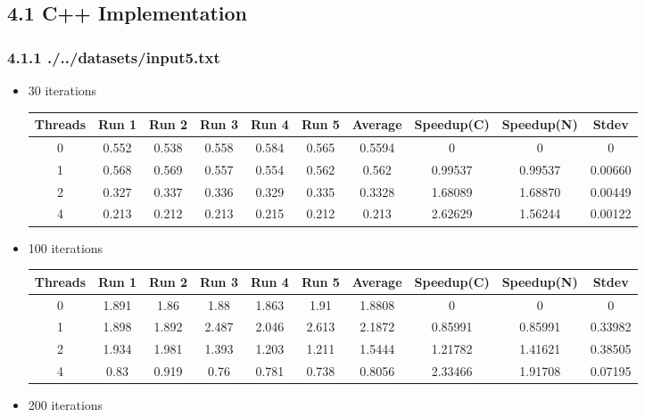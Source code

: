 \subsection*{4.1 C++ Implementation}\subsubsection*{4.1.1 ./../datasets/input5.txt} 
 \begin{itemize}
\item 30 iterations
\begin{center}
 \begin{adjustbox}{width=\columnwidth, center} 
 \begin{tabular}{ | |c | c c c c c | c | c c | c | |} \hline 
 Threads & Run 1 & Run 2 & Run 3 & Run 4 & Run 5 & Average & Speedup(C) & Speedup(N) & Stdev \\ [0.5ex] 
 \hline 
 \hline 
0& 0.552 & 0.538 & 0.558 & 0.584 & 0.565 & 0.5594 & 0 & 0 & 0\\ 
 \hline
1& 0.568 & 0.569 & 0.557 & 0.554 & 0.562 & 0.562 & 0.99537 & 0.99537 & 0.00660\\ 
 \hline
2& 0.327 & 0.337 & 0.336 & 0.329 & 0.335 & 0.3328 & 1.68089 & 1.68870 & 0.00449\\ 
 \hline
4& 0.213 & 0.212 & 0.213 & 0.215 & 0.212 & 0.213 & 2.62629 & 1.56244 & 0.00122\\ 
 \hline
\end{tabular} \end{adjustbox} \end{center}\item 100 iterations
\begin{center}
 \begin{adjustbox}{width=\columnwidth, center} 
 \begin{tabular}{ | |c | c c c c c | c | c c | c | |} \hline 
 Threads & Run 1 & Run 2 & Run 3 & Run 4 & Run 5 & Average & Speedup(C) & Speedup(N) & Stdev \\ [0.5ex] 
 \hline 
 \hline 
0& 1.891 & 1.86 & 1.88 & 1.863 & 1.91 & 1.8808 & 0 & 0 & 0\\ 
 \hline
1& 1.898 & 1.892 & 2.487 & 2.046 & 2.613 & 2.1872 & 0.85991 & 0.85991 & 0.33982\\ 
 \hline
2& 1.934 & 1.981 & 1.393 & 1.203 & 1.211 & 1.5444 & 1.21782 & 1.41621 & 0.38505\\ 
 \hline
4& 0.83 & 0.919 & 0.76 & 0.781 & 0.738 & 0.8056 & 2.33466 & 1.91708 & 0.07195\\ 
 \hline
\end{tabular} \end{adjustbox} \end{center}\item 200 iterations

\end{itemize}
